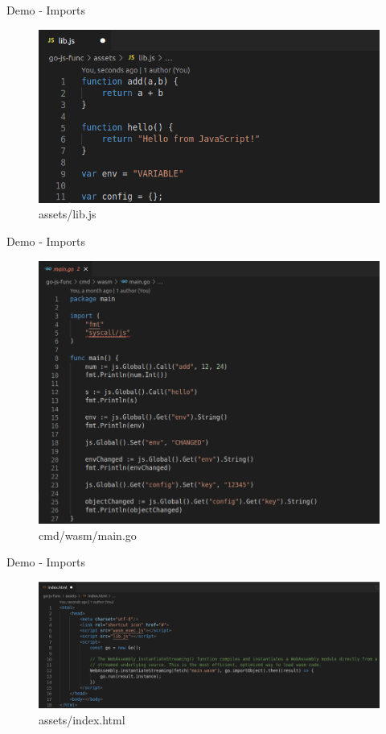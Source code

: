 \documentclass{beamer}
\begin{document}
\begin{frame}{Demo - Imports}
\begin{figure}
        \includegraphics[scale=0.4]{./images/lib.png}
        \caption{assets/lib.js}
    \end{figure}
\end{frame}

\begin{frame}{Demo - Imports}
 \begin{figure}
        \includegraphics[scale=0.2]{./images/importmain.png}
        \caption{cmd/wasm/main.go}
    \end{figure}
\end{frame}

\begin{frame}{Demo - Imports}
    \begin{figure}
        \includegraphics[scale=0.2]{./images/importindex.png}
        \caption{assets/index.html}
    \end{figure}
\end{frame}
\end{document}
